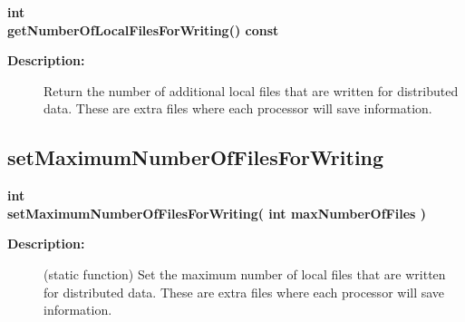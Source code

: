 \begin{flushleft} \textbf{%
int  \\ 
\settowidth{\GenericDataBaseIncludeArgIndent}{getNumberOfLocalFilesForWriting(}%
getNumberOfLocalFilesForWriting() const 
}\end{flushleft}
\begin{description}
\item[{\bf Description:}]  
   Return the number of additional local files that are written for distributed data.
 These are extra files where each processor will save information. 
\end{description}
\subsection{setMaximumNumberOfFilesForWriting}
 
\begin{flushleft} \textbf{%
int  \\ 
\settowidth{\GenericDataBaseIncludeArgIndent}{setMaximumNumberOfFilesForWriting(}%
setMaximumNumberOfFilesForWriting( int maxNumberOfFiles )
}\end{flushleft}
\begin{description}
\item[{\bf Description:}]  
    (static function) Set the maximum number of local files that are written for distributed data.
    These are extra files where each processor will save information. 
 
\end{description}
